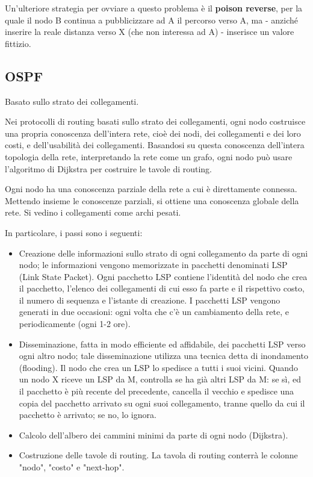             Un'ulteriore strategia per ovviare a questo problema è il \textbf{poison reverse}, per la quale il nodo B continua a pubblicizzare ad A il percorso verso A, ma - anziché inserire la reale distanza verso X (che non interessa ad A) - inserisce un valore fittizio.
            
    \subsection{OSPF}
    
        Basato sullo strato dei collegamenti. 
        
        Nei protocolli di routing basati sullo strato dei collegamenti, ogni nodo costruisce una propria conoscenza dell'intera rete, cioè dei nodi, dei collegamenti e dei loro costi, e dell'usabilità dei collegamenti. Basandosi su questa conoscenza dell'intera topologia della rete, interpretando la rete come un grafo, ogni nodo può usare l'algoritmo di Dijkstra per costruire le tavole di routing.
        
        Ogni nodo ha una conoscenza parziale della rete a cui è direttamente connessa. Mettendo insieme le conoscenze parziali, si ottiene una conoscenza globale della rete. Si vedino i collegamenti come archi pesati.
        
        In particolare, i passi sono i seguenti:
        \begin{itemize}
            \item 
                Creazione delle informazioni sullo strato di ogni collegamento da parte di ogni nodo; le informazioni vengono memorizzate in pacchetti denominati LSP (Link State Packet). Ogni pacchetto LSP contiene l'identità del nodo che crea il pacchetto, l'elenco dei collegamenti di cui esso fa parte e il rispettivo costo, il numero di sequenza e l'istante di creazione. I pacchetti LSP vengono generati in due occasioni: ogni volta che c'è un cambiamento della rete, e periodicamente (ogni 1-2 ore).
            
            \item
                Disseminazione, fatta in modo efficiente ed affidabile, dei pacchetti LSP verso ogni altro nodo; tale disseminazione utilizza una tecnica detta di inondamento (flooding). Il nodo che crea un LSP lo spedisce a tutti i suoi vicini. Quando un nodo X riceve un LSP da M, controlla se ha già altri LSP da M: se sì, ed il pacchetto è più recente del precedente, cancella il vecchio e spedisce una copia del pacchetto arrivato su ogni suoi collegamento, tranne quello da cui il pacchetto è arrivato; se no, lo ignora.
                
            \item
                Calcolo dell'albero dei cammini minimi da parte di ogni nodo (Dijkstra).
                
            \item
                Costruzione delle tavole di routing. La tavola di routing conterrà le colonne "nodo", "costo" e "next-hop".
        \end{itemize}
    
